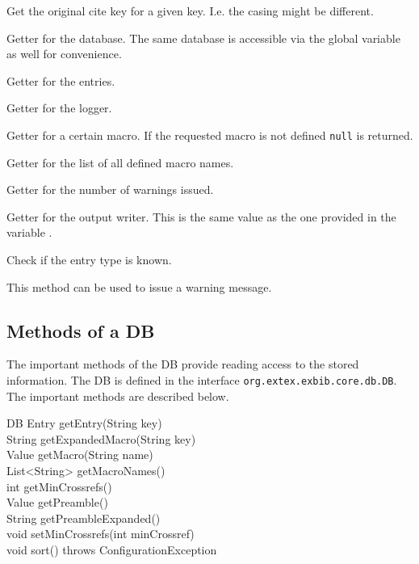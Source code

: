 \begin{methods}

    Get the original cite key for a given key. I.e. the casing might be
    different.

    Getter for the database. The same database is accessible via the
    global variable  as well for convenience.

    Getter for the entries.

    Getter for the logger.

    Getter for a certain macro. If the requested macro is not defined
    \texttt{null} is returned.

    Getter for the list of all defined macro names.

    Getter for the number of warnings issued.

    Getter for the output writer. This is the same value as the one
    provided in the variable .

    Check if the entry type is known.

    This method can be used to issue a warning message.

\end{methods}


\subsection{Methods of a DB}\label{sec:groovy.db}

The important methods of the DB provide reading access to the stored
information. The DB is defined in the interface \texttt{org.extex.exbib.core.db.DB}.
The important methods are described below.

\begin{UMLclass}{DB}
  Entry getEntry(String key)\\
  String getExpandedMacro(String key)\\
  Value getMacro(String name)\\
  List<String> getMacroNames()\\
  int getMinCrossrefs()\\
  Value getPreamble()\\
  String getPreambleExpanded()\\
  void setMinCrossrefs(int minCrossref)\\
  void sort() throws ConfigurationException
\end{UMLclass}

